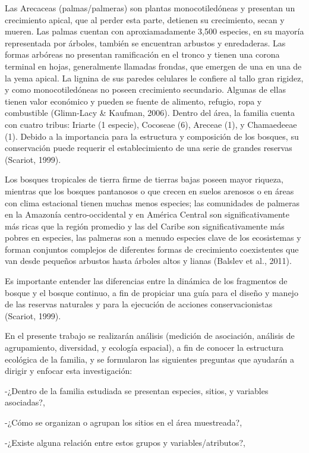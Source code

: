 \documentclass[11pt,]{article}
\begin{document}
Las Arecaceas (palmas/palmeras) son plantas monocotiledóneas y presentan
un crecimiento apical, que al perder esta parte, detienen su
crecimiento, secan y mueren. Las palmas cuentan con aproxiamadamente
3,500 especies, en su mayoría representada por árboles, también se
encuentran arbustos y enredaderas. Las formas arbóreas no presentan
ramificación en el tronco y tienen una corona terminal en hojas,
generalmente llamadas frondas, que emergen de una en una de la yema
apical. La lignina de sus paredes celulares le confiere al tallo gran
rigidez, y como monocotiledóneas no poseen crecimiento secundario.
Algunas de ellas tienen valor económico y pueden se fuente de alimento,
refugio, ropa y combustible (Glimn-Lacy \& Kaufman, 2006). Dentro del
área, la familia cuenta con cuatro tribus: Iriarte (1 especie), Cocoseae
(6), Areceae (1), y Chamaedeeae (1). Debido a la importancia para la
estructura y composición de los bosques, su conservación puede requerir
el establecimiento de una serie de grandes reservas (Scariot, 1999).

Los bosques tropicales de tierra firme de tierras bajas poseen mayor
riqueza, mientras que los bosques pantanosos o que crecen en suelos
arenosos o en áreas con clima estacional tienen muchas menos especies;
las comunidades de palmeras en la Amazonía centro-occidental y en
América Central son significativamente más ricas que la región promedio
y las del Caribe son significativamente más pobres en especies, las
palmeras son a menudo especies clave de los ecosistemas y forman
conjuntos complejos de diferentes formas de crecimiento coexistentes que
van desde pequeños arbustos hasta árboles altos y lianas (Balslev et
al., 2011).

Es importante entender las diferencias entre la dinámica de los
fragmentos de bosque y el bosque continuo, a fin de propiciar una guía
para el diseño y manejo de las reservas naturales y para la ejecución de
acciones conservacionistas (Scariot, 1999).

En el presente trabajo se realizarán análisis (medición de asociación,
análisis de agrupamiento, diversidad, y ecología espacial), a fin de
conocer la estructura ecológica de la familia, y se formularon las
siguientes preguntas que ayudarán a dirigir y enfocar esta
investigación:

-¿Dentro de la familia estudiada se presentan especies, sitios, y
variables asociadas?,

-¿Cómo se organizan o agrupan los sitios en el área muestreada?,

-¿Existe alguna relación entre estos grupos y variables/atributos?,
\end{document}

